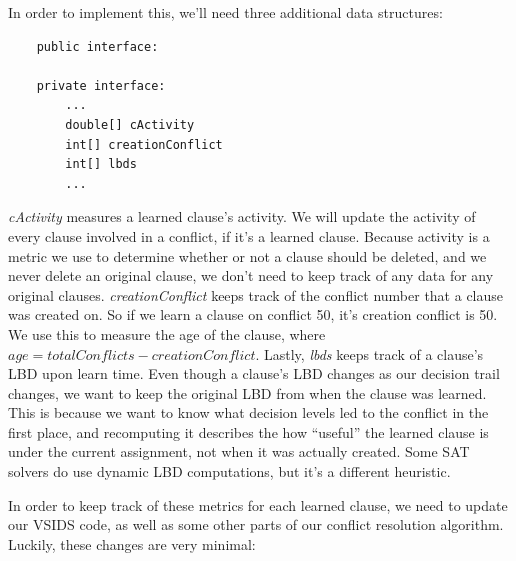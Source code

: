 In order to implement this, we'll need three additional data structures:
\begin{lstlisting}
    public interface:

    private interface:
        ...
        double[] cActivity
        int[] creationConflict
        int[] lbds
        ...
\end{lstlisting}
\noindent
\textit{cActivity} measures a learned clause's activity. We will update the activity of 
every clause involved in a conflict, if it's a learned clause. Because activity is a metric 
we use to determine whether or not a clause should be deleted, and we never delete an original 
clause, we don't need to keep track of any data for any original clauses. 
\textit{creationConflict} keeps track of the conflict number that a clause was created on.
So if we learn a clause on conflict 50, it's creation conflict is 50. We use this to measure the 
age of the clause, where $age = totalConflicts - creationConflict$.
Lastly, \textit{lbds} keeps track of a clause's LBD upon learn time. Even though a clause's LBD 
changes as our decision trail changes, we want to keep the original LBD from when the clause was 
learned. This is because we want to know what decision levels led to the conflict in the first place, 
and recomputing it describes the how ``useful'' the learned clause is under the current assignment, 
not when it was actually created. Some SAT solvers do use dynamic LBD computations, but it's a 
different heuristic.

In order to keep track of these metrics for each learned clause, we need to update our 
VSIDS code, as well as some other parts of our conflict resolution algorithm. Luckily, 
these changes are very minimal:

